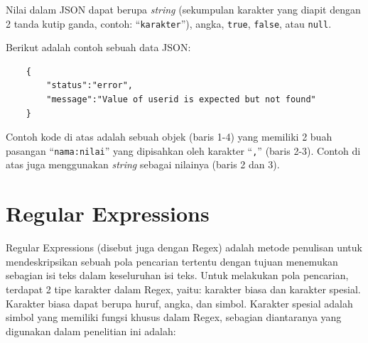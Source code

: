 Nilai dalam JSON dapat berupa \textit{string} (sekumpulan karakter yang diapit dengan 2 tanda kutip ganda, contoh: ``\texttt{karakter}''), angka, \texttt{true}, \texttt{false}, atau \texttt{null}.

Berikut adalah contoh sebuah data JSON:
\begin{lstlisting}
	{
		"status":"error",
		"message":"Value of userid is expected but not found"
	}
\end{lstlisting}

Contoh kode di atas adalah sebuah objek (baris 1-4) yang memiliki 2 buah pasangan ``\texttt{nama:nilai}'' yang dipisahkan oleh karakter ``\texttt{,}'' (baris 2-3). Contoh di atas juga menggunakan \textit{string} sebagai nilainya (baris 2 dan 3).

\section{Regular Expressions}
\label{sec:regex}
Regular Expressions (disebut juga dengan Regex) adalah metode penulisan untuk mendeskripsikan sebuah pola pencarian tertentu dengan tujuan menemukan sebagian isi teks dalam keseluruhan isi teks\cite{regex}. Untuk melakukan pola pencarian, terdapat 2 tipe karakter dalam Regex, yaitu: karakter biasa dan karakter spesial. Karakter biasa dapat berupa huruf, angka, dan simbol. Karakter spesial adalah simbol yang memiliki fungsi khusus dalam Regex, sebagian diantaranya yang digunakan dalam penelitian ini adalah: 
